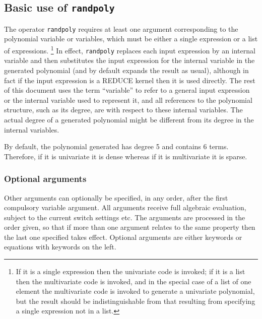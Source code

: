 \subsection{Basic use of {\tt randpoly}}
\label{randpolysec:Basic}

The operator {\tt randpoly} requires at least one argument
corresponding to the polynomial variable or variables, which must be
either a single expression or a list of expressions.%
\footnote{If it is a single expression then the univariate code is
invoked; if it is a list then the multivariate code is invoked, and in
the special case of a list of one element the multivariate code is
invoked to generate a univariate polynomial, but the result should be
indistinguishable from that resulting from specifying a single
expression not in a list.} %
In effect, {\tt randpoly} replaces each input expression by an
internal variable and then substitutes the input expression for the
internal variable in the generated polynomial (and by default expands
the result as usual), although in fact if the input expression is a
REDUCE kernel then it is used directly.  The rest of this document
uses the term ``variable'' to refer to a general input expression or
the internal variable used to represent it, and all references to the
polynomial structure, such as its degree, are with respect to these
internal variables.  The actual degree of a generated polynomial might
be different from its degree in the internal variables.

By default, the polynomial generated has degree 5 and contains 6
terms.  Therefore, if it is univariate it is dense whereas if it is
multivariate it is sparse.


\subsubsection{Optional arguments}

Other arguments can optionally be specified, in any order, after the
first compulsory variable argument.  All arguments receive full
algebraic evaluation, subject to the current switch settings etc.  The
arguments are processed in the order given, so that if more than one
argument relates to the same property then the last one specified
takes effect.  Optional arguments are either keywords or equations
with keywords on the left.

